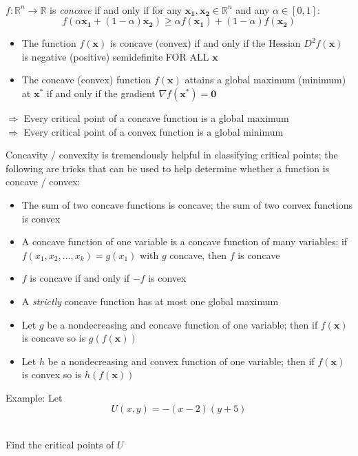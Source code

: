 \documentclass[10pt]{seminar}
\begin{document}
\begin{slide}
\ \\$f:\mathbb{R}^n\rightarrow \mathbb{R}$ is \textit{concave} if and only if for any $\mathbf{x_1, x_2}\in \mathbb{R}^n$ and any $\alpha\in [0, 1]$: $$f(\alpha \mathbf{x_1}+(1-\alpha)\mathbf{x_2})\geq \alpha f(\mathbf{x_1})+(1-\alpha)f(\mathbf{x_2})$$

\begin{itemize}
\item The function $f(\mathbf{x})$ is concave (convex) if and only if the Hessian $D^2f(\mathbf{x})$ is negative (positive) semidefinite FOR ALL $\mathbf{x}$
\item The concave (convex) function $f(\mathbf{x})$ attains a global maximum (minimum) at $\mathbf{x}^*$ if and only if the gradient $\nabla f(\mathbf{x}^*)=\mathbf{0}$
\end{itemize}

$\Rightarrow$ Every critical point of a concave function is a global maximum\\
$\Rightarrow$ Every critical point of a convex function is a global minimum

\newslide

\small
Concavity / convexity is tremendously helpful in classifying critical points; the following are tricks that can be used to help determine whether a function is concave / convex:

\begin{itemize}
\item The sum of two concave functions is concave; the sum of two convex functions is convex
\item A concave function of one variable is a concave function of many variables: if $f(x_1, x_2, ..., x_k)=g(x_1)$ with $g$ concave, then $f$ is concave
\item $f$ is concave if and only if $-f$ is convex
\item A \textit{strictly} concave function has at most one global maximum
\item Let $g$ be a nondecreasing and concave function of one variable; then if $f(\mathbf{x})$ is concave so is $g(f(\mathbf{x}))$
\item Let $h$ be a nondecreasing and convex function of one variable; then if $f(\mathbf{x})$ is convex so is $h(f(\mathbf{x}))$
\end{itemize}

\newslide
Example: Let $$U(x, y)= -(x-2)(y+5)$$

\ \\Find the critical points of $U$


\end{slide}
\end{document}

